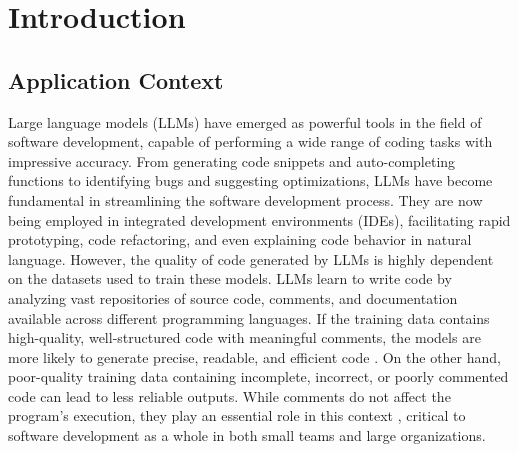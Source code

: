 
\chapter{Introduction} %

\label{Chapter1} %


\newcommand{\keyword}[1]{\textbf{#1}}
\newcommand{\tabhead}[1]{\textbf{#1}}
\newcommand{\code}[1]{\texttt{#1}}
\newcommand{\file}[1]{\texttt{\bfseries#1}}
\newcommand{\option}[1]{\texttt{\itshape#1}}


\section{Application Context} 
Large language models (LLMs) have emerged as powerful tools in the field of software development, capable of performing a wide range of coding tasks with impressive accuracy. From generating code snippets and auto-completing functions to identifying bugs and suggesting optimizations, LLMs have become fundamental in streamlining the software development process. They are now being employed in integrated development environments (IDEs), facilitating rapid prototyping, code refactoring, and even explaining code behavior in natural language.
However, the quality of code generated by LLMs is highly dependent on the datasets used to train these models. LLMs learn to write code by analyzing vast repositories of source code, comments, and documentation available across different programming languages. If the training data contains high-quality, well-structured code with meaningful comments, the models are more likely to generate precise, readable, and efficient code \cite{dlCR}. On the other hand, poor-quality training data containing incomplete, incorrect, or poorly commented code can lead to less reliable outputs.
While comments do not affect the program’s execution, they play an essential role in this context \cite{codeReadability}  \cite{codeMaintainability}, critical to software development as a whole in both small teams and large organizations.

